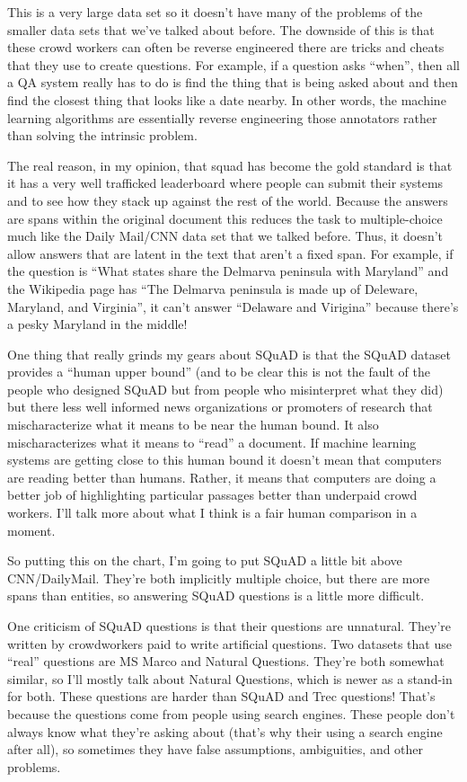 This is a very large data set so it doesn't have many of the problems of the smaller data sets that we've talked about before. The downside of this is that these crowd workers can often be reverse engineered there are tricks and cheats that they use to create questions.  For example, if a question asks “when”, then all a QA system really has to do is find the thing that is being asked about and then find the closest thing that looks like a date nearby.  In other words, the machine learning algorithms are essentially reverse engineering those annotators rather than solving the intrinsic problem.

The real reason, in my opinion, that squad has become the gold standard is that it has a very well trafficked leaderboard where people can submit their systems and to see how they stack up against the rest of the world.  Because the answers are spans within the original document this reduces the task to multiple-choice much like the Daily Mail/CNN data set that we talked before.  Thus, it doesn't allow answers that are latent in the text that aren’t a fixed span.  For example, if the question is “What states share the Delmarva peninsula with Maryland” and the Wikipedia page has “The Delmarva peninsula is made up of Deleware, Maryland, and Virginia”, it can’t answer “Delaware and Virigina” because there’s a pesky Maryland in the middle!

One thing that really grinds my gears about SQuAD is that the SQuAD dataset provides a “human upper bound” (and to be clear this is not the fault of the people who designed SQuAD but from people who misinterpret what they did) but there less well informed news organizations or promoters of research that mischaracterize what it means to be near the human bound.  It also mischaracterizes what it means to “read” a document.  If machine learning systems are getting close to this human bound it doesn't mean that computers are reading better than humans.  Rather, it means that computers are doing a better job of highlighting particular passages better than underpaid crowd workers.  I’ll talk more about what I think is a fair human comparison in a moment.

So putting this on the chart, I’m going to put SQuAD a little bit above CNN/DailyMail.  They’re both implicitly multiple choice, but there are more spans than entities, so answering SQuAD questions is a little more difficult.

One criticism of SQuAD questions is that their questions are unnatural.  They’re written by crowdworkers paid to write artificial questions.  Two datasets that use “real” questions are MS Marco and Natural Questions.  They’re both somewhat similar, so I’ll mostly talk about Natural Questions, which is newer as a stand-in for both.  These questions are harder than SQuAD and Trec questions!  That’s because the questions come from people using search engines.  These people don’t always know what they’re asking about (that’s why their using a search engine after all), so sometimes they have false assumptions, ambiguities, and other problems.  

